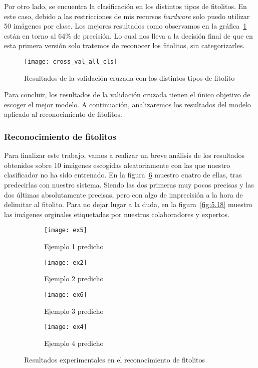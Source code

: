 Por otro lado, se encuentra la clasificación en los distintos tipos de fitolitos. En este caso, debido a las restricciones de mis recursos \textit{hardware} solo puedo utilizar 50 imágenes por clase. Los mejores resultados como observamos en la gráfica~\ref{fig:cross_val_all} están en torno al 64\% de precisión. Lo cual nos lleva a la decisión final de que en esta primera versión solo tratemos de reconocer los fitolitos, sin categorizarles.

\begin{figure}
\centering
\texttt{[image: cross\_val\_all\_cls]}
\caption{Resultados de la validación cruzada con los distintos tipos de fitolito}
\label{fig:cross_val_all}
\end{figure}

Para concluir, los resultados de la validación cruzada tienen el único objetivo de escoger el mejor modelo. A continuación, analizaremos los resultados del modelo aplicado al reconocimiento de fitolitos.

\subsubsection{Reconocimiento de fitolitos}

Para finalizar este trabajo, vamos a realizar un breve análisis de los resultados obtenidos sobre 10 imágenes escogidas aleatoriamente con las que nuestro clasificador no ha sido entrenado. En la figura~\ref{fig:5.17} muestro cuatro de ellas, tras predecirlas con nuestro sistema. Siendo las dos primeras muy pocos precisas y las dos últimas absolutamente precisas, pero con algo de imprecisión a la hora de delimitar al fitolito. Para no dejar lugar a la duda, en la figura~\ref{fig:5.18} muestro las imágenes orginales etiquetadas por nuestros colaboradores y expertos.

\begin{figure}
	\centering
	\begin{subfigure}[b]{0.45\textwidth}
        \texttt{[image: ex5]}
        \caption{Ejemplo 1 predicho}
        \label{subfig:fej1}
    \end{subfigure}
    \begin{subfigure}[b]{0.45\textwidth}
        \texttt{[image: ex2]}
        \caption{Ejemplo 2 predicho}
        \label{subfig:fej2}
    \end{subfigure}
    \begin{subfigure}[b]{0.45\textwidth}
        \texttt{[image: ex6]}
        \caption{Ejemplo 3 predicho}
        \label{subfig:fe3}
    \end{subfigure}
    \begin{subfigure}[b]{0.45\textwidth}
        \texttt{[image: ex4]}
        \caption{Ejemplo 4 predicho}
        \label{subfig:fe4}
    \end{subfigure}
        \caption{Resultados experimentales en el reconocimiento de fitolitos}
	\label{fig:5.17}
\end{figure}

